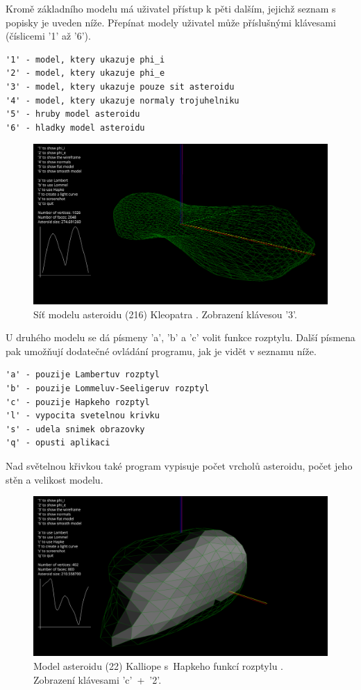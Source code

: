 \documentclass[11pt]{article}
\begin{document}
Kromě základního modelu má uživatel přístup k pěti dalším, jejichž seznam s popisky je uveden níže. Přepínat modely uživatel může příslušnými klávesami (číslicemi '1' až '6').  

\begin{lstlisting}
'1' - model, ktery ukazuje phi_i
'2' - model, ktery ukazuje phi_e
'3' - model, ktery ukazuje pouze sit asteroidu
'4' - model, ktery ukazuje normaly trojuhelniku
'5' - hruby model asteroidu
'6' - hladky model asteroidu
\end{lstlisting}

\begin{figure}[h]
\includegraphics[width=12cm]{figs/Kleopatra.png}
\centering
\caption{Síť modelu asteroidu (216) Kleopatra \cite{Marchis_2021A&A...653A..57M,Broz_2021A&A...653A..56B}.
Zobrazení klávesou '3'.
}
\label{kleopatra}
\end{figure}

U druhého modelu se dá písmeny 'a', 'b' a 'c' volit funkce rozptylu. Další písmena pak umožňují dodatečné ovládání programu, jak je vidět v seznamu níže.

\begin{lstlisting}
'a' - pouzije Lambertuv rozptyl
'b' - pouzije Lommeluv-Seeligeruv rozptyl
'c' - pouzije Hapkeho rozptyl
'l' - vypocita svetelnou krivku
's' - udela snimek obrazovky
'q' - opusti aplikaci
\end{lstlisting}

Nad světelnou křivkou také program vypisuje počet vrcholů asteroidu, počet jeho stěn a velikost modelu. 

\begin{figure}[h]
\includegraphics[width=12cm]{figs/Kalliope.png}
\centering
\caption{Model asteroidu (22) Kalliope s~Hapkeho funkcí rozptylu \cite{Ferrais_2022A&A...662A..71F,Broz_2023A&A...676A..60B}.
Zobrazení klávesami 'c'~+~'2'.
}
\label{kalliope}
\end{figure}
\end{document}

